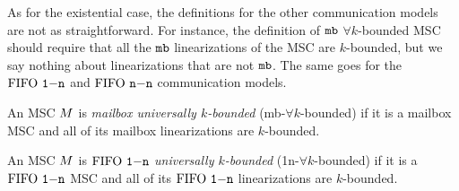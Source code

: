 As for the existential case, the definitions for the other communication models are not as straightforward. For instance, the definition of $\mathtt{mb}$ $\forall k$-bounded MSC should require that all the $\mathtt{mb}$ linearizations of the MSC are $k$-bounded, but we say nothing about linearizations that are not $\mathtt{mb}$. The same goes for the $\text{FIFO } \mathtt{1\mathsf{-}n}$ and $\text{FIFO } \mathtt{n\mathsf{-}n}$ communication models.

\begin{definition}
	An MSC $M$ is \emph{mailbox universally $k$-bounded} (mb-$\forall k$-bounded) if it is a mailbox MSC and all of its mailbox linearizations are $k$-bounded.
\end{definition}
\begin{definition}
	An MSC $M$ is \emph{$\text{FIFO } \mathtt{1\mathsf{-}n}$ universally $k$-bounded} (1n-$\forall k$-bounded) if it is a $\text{FIFO } \mathtt{1\mathsf{-}n}$ MSC and all of its $\text{FIFO } \mathtt{1\mathsf{-}n}$ linearizations are $k$-bounded.
\end{definition}




